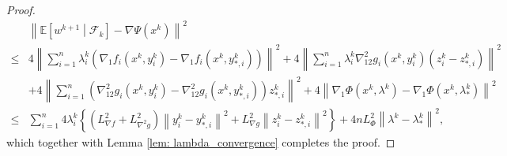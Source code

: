 \documentclass[10pt]{article}
\theoremstyle{remark}
\def\setF{\mathscr{F}} %
\newcommand{\E}{\mathbb{E}}
\newcommand{\norm}[1]{\left\|#1\right\|}
\def\<#1,#2>{\left\langle #1,#2\right\rangle}
\begin{document}
\begin{proof}

\begin{align*}
    &\norm{\E\left[w^{k+1}\middle|\setF_k\right] - \nabla\Psi(x^k)}^2 \\
    \leq &4\norm{\sum_{i=1}^{n}\lambda_i^k \left(\nabla_1 f_i(x^k, y_i^k) - \nabla_1 f_i(x^k, y_{*,i}^k)\right)}^2 + 4\norm{\sum_{i=1}^{n}\lambda_i^k\nabla_{12}^2g_i(x^k, y_i^k)\left( z_i^k - z_{*,i}^k\right)}^2\\
    & + 4\norm{\sum_{i=1}^{n}\left(\nabla_{12}^2g_i(x^k, y_i^k) - \nabla_{12}^2g_i(x^k,y_{*,i}^k)\right)z_{*,i}^k}^2  + 4\norm{\nabla_1\Phi(x^k,\lambda^k) - \nabla_1\Phi(x^k,\lambda_*^k)}^2\\
    \leq &\sum_{i=1}^{n}4\lambda_i^k \left\{\left(L_{\nabla f}^2 + L_{\nabla^2 g}^2\right)\norm{y_i^k - y_{*,i}^k}^2 + L_{\nabla g}^2\norm{z_i^k - z_{*,i}^k}^2\right\} + 4nL_{\Phi}^2\norm{\lambda^k-\lambda_*^k}^2,
\end{align*}
which together with Lemma \ref{lem: lambda_convergence} completes the proof.
\end{proof}
\end{document}
